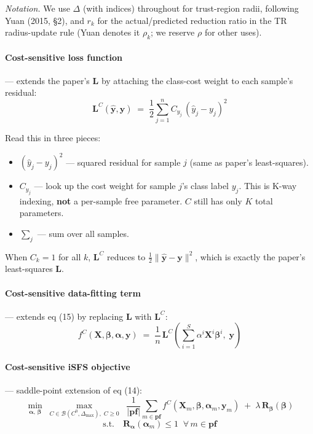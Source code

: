 \documentclass[11pt,a4paper]{article}
\begin{document}
\noindent\emph{Notation.} We use $\Delta$ (with indices) throughout for trust-region radii, following Yuan (2015, \S 2), and $r_k$ for the actual/predicted reduction ratio in the TR radius-update rule (Yuan denotes it $\rho_k$; we reserve $\rho$ for other uses).

\paragraph{Cost-sensitive loss function} --- extends the paper's $\mathbf{L}$ by attaching the class-cost weight to each sample's residual:
\begin{equation}
\boxed{\;\mathbf{L}^{C}(\hat{\mathbf{y}},\mathbf{y}) \;=\; \frac{1}{2}\sum_{j=1}^{n} C_{y_{j}}\,(\hat{y}_{j} - y_{j})^{2}\;}
\end{equation}

Read this in three pieces:
\begin{itemize}[leftmargin=*,itemsep=2pt]
  \item $(\hat{y}_j - y_j)^2$ --- squared residual for sample $j$ (same as paper's least-squares).
  \item $C_{y_j}$ --- look up the cost weight for sample $j$'s class label $y_j$. This is K-way indexing, \textbf{not} a per-sample free parameter. $C$ still has only $K$ total parameters.
  \item $\sum_j$ --- sum over all samples.
\end{itemize}

When $C_k = 1$ for all $k$, $\mathbf{L}^C$ reduces to $\frac{1}{2}\|\hat{\mathbf{y}} - \mathbf{y}\|^2$, which is exactly the paper's least-squares $\mathbf{L}$.

\paragraph{Cost-sensitive data-fitting term} --- extends eq (15) by replacing $\mathbf{L}$ with $\mathbf{L}^C$:
\begin{equation}
\boxed{\;f^{C}(\mathbf{X},\boldsymbol{\beta},\boldsymbol{\alpha},\mathbf{y}) \;=\; \frac{1}{n}\,\mathbf{L}^{C}\!\left(\sum_{i=1}^{S}\alpha^{i}\mathbf{X}^{i}\boldsymbol{\beta}^{i},\;\mathbf{y}\right)\;}
\end{equation}

\paragraph{Cost-sensitive iSFS objective} --- saddle-point extension of eq (14):
\begin{equation}
\boxed{\;
\min_{\boldsymbol{\alpha},\,\boldsymbol{\beta}}\;\max_{C \in \mathcal B(C^0,\Delta_{\max}),\;C\ge 0}\;\;\frac{1}{|\mathbf{pf}|}\sum_{m \in \mathbf{pf}} f^{C}(\mathbf{X}_m,\boldsymbol{\beta},\boldsymbol{\alpha}_m,\mathbf{y}_m) \;+\; \lambda\,\mathbf{R}_{\boldsymbol{\beta}}(\boldsymbol{\beta})
\;}
\end{equation}
\[
\text{s.t.}\quad \mathbf{R}_{\boldsymbol{\alpha}}(\boldsymbol{\alpha}_m) \leq 1\;\;\forall\,m \in \mathbf{pf}
\]
\end{document}
